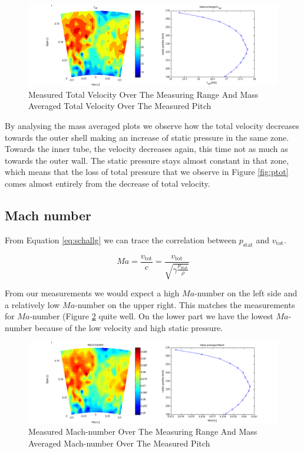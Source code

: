 \begin{figure}[H]
\centering
\includegraphics[trim = 110px 0px 80px 0px, clip = true,width=\textwidth]{pics/vtot.png}
\caption{Measured Total Velocity Over The Measuring Range And Mass Averaged Total Velocity Over The Measured Pitch}
\label{fig:vtot}
\end{figure}

By analysing the mass averaged plots we observe how the total velocity decreases towards the outer shell making an increase of static pressure in the same zone. Towards the inner tube, the velocity decreases again, this time not as much as towards the outer wall. The static pressure stays almost constant in that zone, which means that the loss of total pressure that we observe in Figure \ref{fig:ptot} comes almost entirely from the decrease of total velocity.

\subsection{Mach number}

From Equation \ref{eq:schallg} we can trace the correlation between $p_\text{stat}$ and $v_\text{tot}$.

\begin{equation}
Ma = \frac{v_\text{tot}}{c} = \frac{v_\text{tot}}{\sqrt{\gamma \frac{p_\text{stat}}{\rho}}}
\label{eq:schallg}
\end{equation}

 From our measurements we would expect a high $Ma$-number on the left side and a relatively low $Ma$-number on the upper right. This matches the measurements for $Ma$-number (Figure \ref{fig:mach} quite well. On the lower part we have the lowest $Ma$-number because of the low velocity and high static pressure.





\begin{figure}[H]
\centering
\includegraphics[trim = 110px 0px 80px 0px, clip = true,width=\textwidth]{pics/mach.png}
\caption{Measured Mach-number Over The Measuring Range And Mass Averaged Mach-number Over The Measured Pitch}
\label{fig:mach}
\end{figure}


